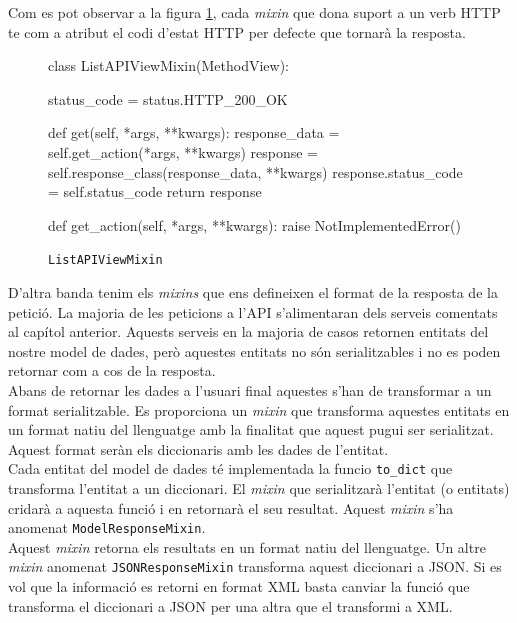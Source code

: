 Com es pot observar a la figura \ref{fig:mixin}, cada \emph{mixin} que dona suport a un verb \ac{HTTP} te com a atribut el codi d'estat \ac{HTTP} per defecte que tornarà la resposta. \\

\begin{figure}[h!]
	\begin{python}
class ListAPIViewMixin(MethodView):

	status_code = status.HTTP_200_OK
	
	def get(self, *args, **kwargs):
		response_data = self.get_action(*args, **kwargs)
		response = self.response_class(response_data, **kwargs)
		response.status_code = self.status_code
		return response
		
	def get_action(self, *args, **kwargs):
		raise NotImplementedError()
	\end{python}
	\caption{\texttt{ListAPIViewMixin}}
	\label{fig:mixin}
\end{figure}

D'altra banda tenim els \emph{mixins} que ens defineixen el format de la resposta de la petició. La majoria de les peticions a l'\ac{API} s'alimentaran dels serveis comentats al capítol anterior. Aquests serveis en la majoria de casos retornen entitats del nostre model de dades, però aquestes entitats no són serialitzables i no es poden retornar com a cos de la resposta. \\

Abans de retornar les dades a l'usuari final aquestes s'han de transformar a un format serialitzable. Es proporciona un \emph{mixin} que transforma aquestes entitats en un format natiu del llenguatge amb la finalitat que aquest pugui ser serialitzat. Aquest format seràn els diccionaris amb les dades de l'entitat.\\

Cada entitat del model de dades té implementada la funcio \texttt{to\_dict} que transforma l'entitat a un diccionari. El \emph{mixin} que serialitzarà l'entitat (o entitats) cridarà a aquesta funció i en retornarà el seu resultat. Aquest \emph{mixin} s'ha anomenat \texttt{ModelResponseMixin}.\\

Aquest \emph{mixin} retorna els resultats en un format natiu del llenguatge. Un altre \emph{mixin} anomenat \texttt{JSONResponseMixin} transforma aquest diccionari a \ac{JSON}. Si es vol que la informació es retorni en format \ac{XML} basta canviar la funció que transforma el diccionari a \ac{JSON} per una altra que el transformi a \ac{XML}.\\

